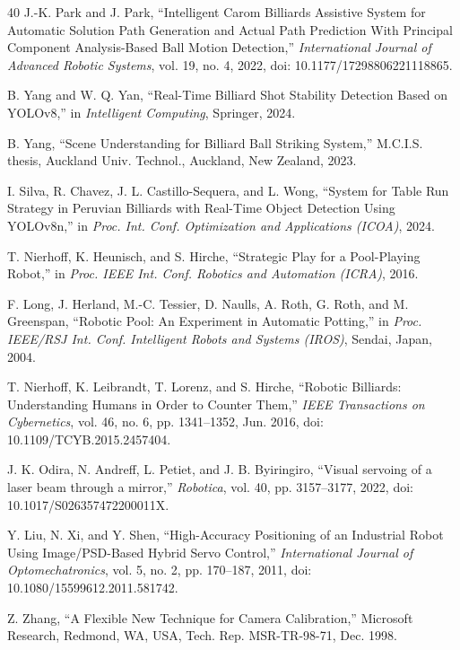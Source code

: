 \begin{thebibliography}{40}
 J.-K. Park and J. Park, ``Intelligent Carom Billiards Assistive System for Automatic Solution Path Generation and Actual Path Prediction With Principal Component Analysis-Based Ball Motion Detection,'' \textit{International Journal of Advanced Robotic Systems}, vol. 19, no. 4, 2022, doi: 10.1177/17298806221118865.

 B. Yang and W. Q. Yan, ``Real-Time Billiard Shot Stability Detection Based on YOLOv8,'' in \textit{Intelligent Computing}, Springer, 2024.

 B. Yang, ``Scene Understanding for Billiard Ball Striking System,'' M.C.I.S. thesis, Auckland Univ. Technol., Auckland, New Zealand, 2023.

 I. Silva, R. Chavez, J. L. Castillo-Sequera, and L. Wong, ``System for Table Run Strategy in Peruvian Billiards with Real-Time Object Detection Using YOLOv8n,'' in \textit{Proc. Int. Conf. Optimization and Applications (ICOA)}, 2024.

 T. Nierhoff, K. Heunisch, and S. Hirche, ``Strategic Play for a Pool-Playing Robot,'' in \textit{Proc. IEEE Int. Conf. Robotics and Automation (ICRA)}, 2016.

 F. Long, J. Herland, M.-C. Tessier, D. Naulls, A. Roth, G. Roth, and M. Greenspan, ``Robotic Pool: An Experiment in Automatic Potting,'' in \textit{Proc. IEEE/RSJ Int. Conf. Intelligent Robots and Systems (IROS)}, Sendai, Japan, 2004.

 T. Nierhoff, K. Leibrandt, T. Lorenz, and S. Hirche, ``Robotic Billiards: Understanding Humans in Order to Counter Them,'' \textit{IEEE Transactions on Cybernetics}, vol. 46, no. 6, pp. 1341--1352, Jun. 2016, doi: 10.1109/TCYB.2015.2457404.

 J. K. Odira, N. Andreff, L. Petiet, and J. B. Byiringiro, ``Visual servoing of a laser beam through a mirror,'' \textit{Robotica}, vol. 40, pp. 3157--3177, 2022, doi: 10.1017/S026357472200011X.

 Y. Liu, N. Xi, and Y. Shen, ``High-Accuracy Positioning of an Industrial Robot Using Image/PSD-Based Hybrid Servo Control,'' \textit{International Journal of Optomechatronics}, vol. 5, no. 2, pp. 170--187, 2011, doi: 10.1080/15599612.2011.581742.

 Z. Zhang, ``A Flexible New Technique for Camera Calibration,'' Microsoft Research, Redmond, WA, USA, Tech. Rep. MSR-TR-98-71, Dec. 1998.


\end{thebibliography}
